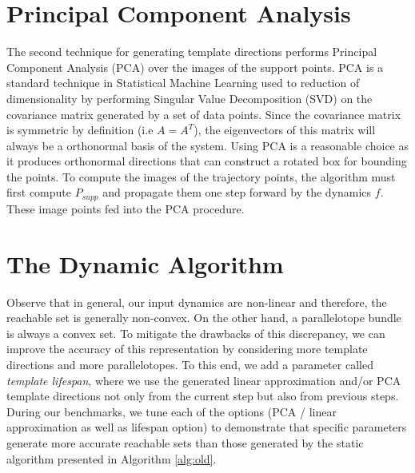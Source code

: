 
\section{Principal Component Analysis}
\label{sec:pca}
The second technique for generating template directions performs Principal Component Analysis (PCA) over the images of the support points.
%
PCA is a standard technique in Statistical Machine Learning used to reduction of dimensionality by performing Singular Value Decomposition (SVD) on the covariance matrix generated by a set of data points.
%
Since the covariance matrix is symmetric by definition (i.e $A = A^T$), the eigenvectors of this matrix will always be a orthonormal basis of the system.
%
Using PCA is a reasonable choice as it produces orthonormal directions that can construct a rotated box for bounding the points.
%
To compute the images of the trajectory points, the algorithm must first compute $P_{supp}$ and propagate them one step forward by the dynamics $f$. These image points fed into the PCA procedure.

\section{The Dynamic Algorithm}
\label{sec:dyna_algo}
Observe that in general, our input dynamics are non-linear and therefore, the reachable set is generally non-convex.
%
On the other hand, a parallelotope bundle is always a convex set.
%
To mitigate the drawbacks of this discrepancy, we can improve the accuracy of this representation by considering more template directions and more parallelotopes.
%
To this end, we add a parameter called \emph{template lifespan}, where we use the generated linear approximation and/or PCA template directions not only from the current step but also from previous steps.
%
During our benchmarks, we tune each of the options (PCA / linear approximation as well as lifespan option) to demonstrate that specific parameters generate more accurate reachable sets than those generated by the static algorithm presented in Algorithm \ref{alg:old}.

